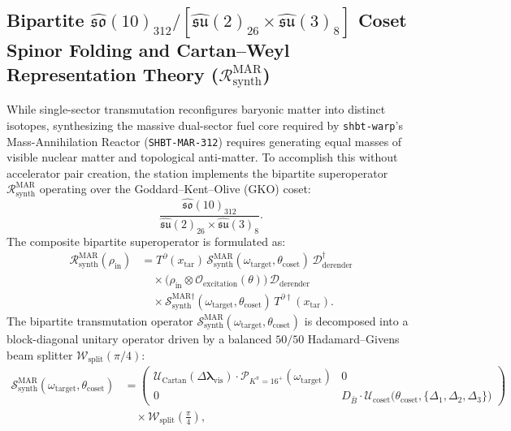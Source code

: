 \documentclass[11pt,onecolumn]{article}
\begin{document}
\subsection[Bipartite Coset Spinor Folding for MAR-312]{Bipartite \texorpdfstring{$\widehat{\mathfrak{so}}(10)_{312} / [\widehat{\mathfrak{su}}(2)_{26} \times \widehat{\mathfrak{su}}(3)_8]$}{SO(10)312 / [SU(2)26 x SU(3)8]} Coset Spinor Folding and Cartan--Weyl Representation Theory (\texorpdfstring{$\mathcal{R}_{\text{synth}}^{\text{MAR}}$}{R(MAR)})}
\label{subsec:coset_spinor_folding}
While single-sector transmutation reconfigures baryonic matter into distinct isotopes, synthesizing the massive dual-sector fuel core required by \texttt{shbt-warp}'s Mass-Annihilation Reactor (\texttt{SHBT-MAR-312}) requires generating equal masses of visible nuclear matter and topological anti-matter. To accomplish this without accelerator pair creation, the station implements the bipartite superoperator $\mathcal{R}_{\text{synth}}^{\text{MAR}}$ operating over the Goddard--Kent--Olive (GKO) coset:
\begin{equation}
\frac{\widehat{\mathfrak{so}}(10)_{312}}{\widehat{\mathfrak{su}}(2)_{26} \times \widehat{\mathfrak{su}}(3)_8}.
\label{eq:gko_coset}
\end{equation}
The composite bipartite superoperator is formulated as:
\begin{equation}
\begin{split}
\mathcal{R}_{\text{synth}}^{\text{MAR}}(\rho_{\text{in}}) &= T^\partial(x_{\text{tar}})\,\mathcal{S}_{\text{synth}}^{\text{MAR}}(\omega_{\text{target}}, \theta_{\text{coset}})\,\mathcal{D}_{\text{derender}}^\dagger \\
&\quad \times \bigl(\rho_{\text{in}} \otimes \mathcal{O}_{\text{excitation}}(\theta)\bigr)\,\mathcal{D}_{\text{derender}} \\
&\quad \times \mathcal{S}_{\text{synth}}^{\text{MAR}\dagger}(\omega_{\text{target}}, \theta_{\text{coset}})\,T^{\partial\dagger}(x_{\text{tar}}).
\end{split}
\label{eq:rsynth_mar}
\end{equation}
The bipartite transmutation operator $\mathcal{S}_{\text{synth}}^{\text{MAR}}(\omega_{\text{target}}, \theta_{\text{coset}})$ is decomposed into a block-diagonal unitary operator driven by a balanced $50/50$ Hadamard--Givens beam splitter $\mathcal{W}_{\text{split}}(\pi/4)$:
\begin{equation}
\begin{split}
\mathcal{S}_{\text{synth}}^{\text{MAR}}(\omega_{\text{target}}, \theta_{\text{coset}}) &= \begin{pmatrix} \mathcal{U}_{\text{Cartan}}(\Delta\bm{\lambda}_{\text{vis}})\cdot\mathcal{P}_{K^\pi = 16^+}(\omega_{\text{target}}) & 0 \\ 0 & D_{\bar{B}}\cdot\mathcal{U}_{\text{coset}}\bigl(\theta_{\text{coset}}, \{\Delta_1, \Delta_2, \Delta_3\}\bigr) \end{pmatrix} \\
&\quad \times \mathcal{W}_{\text{split}}\left(\frac{\pi}{4}\right),
\end{split}
\label{eq:ssynth_mar_block}
\end{equation}
\end{document}
